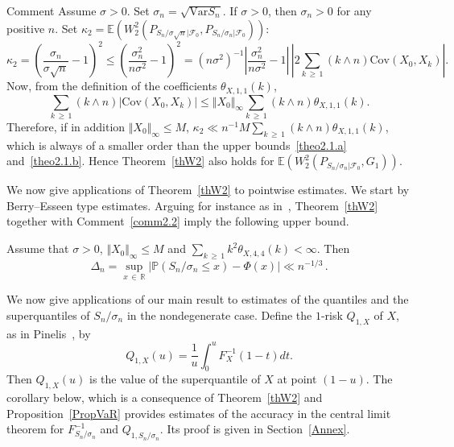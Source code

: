 \documentclass[AHL,Unicode,longabstracts,published]{cedram}
\newcommand{\bbE}{\mathbb{E}}
\newcommand{\clF}{\mathcal{F}}
\newcommand{\bbP}{\mathbb{P}}
\newcommand{\bbR}{\mathbb{R}}
\newcommand{\Cov}{\mathrm{Cov}}
\newcommand{\Var}{\mathrm{Var}}
\begin{document}
\begin{enonce}{Comment} \label{commentaftermainth}
Assume $\sigma >0$. Set $\sigma_n= \sqrt{ \Var S_n }$. If $\sigma>0$, then $\sigma_n>0$ for any positive $n$. Set
$\kappa_2 = \bbE (W_2^2 (P_{S_n / \sigma {\sqrt n} |\clF_0 }, P_{S_n / \sigma_n |\clF_0 }))$:
\[
\kappa_2 =
\left(\frac{\sigma_n}{\sigma \sqrt n} - 1 \right)^2 \leq \left (\frac{\sigma_n^2}{n\sigma^2} - 1 \right)^2 = \left(n\sigma^2\right)^{-1} \left| \frac{\sigma_n^2}{n\sigma^2} - 1 \right| \, \left| 2 \sum_{k\,\geq\,1} (k \wedge n) \Cov (X_0,X_k)\right|.
\]
Now, from the definition of the coefficients $ \theta_{X,1,1} (k)$,
\begin{equation}\label{UpperBoundCov1}
\sum_{k\, \geq\,1} (k \wedge n) | \Cov (X_0,X_k) |
\leq \Vert X_0 \Vert_{\infty} \sum_{k\,\geq\,1} (k \wedge n) \theta_{X,1, 1} (k).
\end{equation}
Therefore, if in addition $\Vert X_0 \Vert_{\infty} \leq M$, $\kappa_2 \ll n^{-1} M \sum_{k\,\geq\,1} (k \wedge n) \theta_{X,1, 1} (k)$, which is always of a smaller order than the upper bounds~\eqref{theo2.1.a} and~\eqref{theo2.1.b}. Hence Theorem~\ref{thW2} also holds for $\bbE (W_2^2 (P_{S_n / \sigma_n |\clF_0 }, G_{1}) ) $.
\end{enonce}

We now give applications of Theorem~\ref{thW2} to pointwise estimates. We start by Berry--Esseen type estimates. Arguing for instance as in~\cite[Remark~2.4]{DMR09}, Theorem~\ref{thW2} together with Comment~\ref{comm2.2} imply the following upper bound.

\begin{coro}\label{AppliBE}
Assume that $\sigma>0$, $\Vert X_0 \Vert_{\infty} \leq M$ and $\sum_{k\, \geq\,1} k^2 \theta_{X,4,4} (k) < \infty$. Then
\[
\Delta_{n} = \sup_{x\,\in\,\bbR}\left| \bbP (S_n/\sigma_n \leq x) - \Phi(x)\right|\ll n^{-1/3} \,.
\]
\end{coro}

We now give applications of our main result to estimates of the quantiles and the superquantiles of $S_n/\sigma_n$ in the nondegenerate case. Define the $1$-risk $Q_{1,X}$ of $X$, as in Pinelis~\cite{Pi14}, by
\begin{equation}\label{DefSuperQuantile}
Q_{1,X} (u) = \frac 1 u \int_0^u F_X^{-1} (1-t) dt.
\end{equation}
Then $Q_{1,X} (u)$ is the value of the superquantile of $X$ at point $(1-u)$. The corollary below, which is a consequence of Theorem~\ref{thW2} and Proposition~\ref{PropVaR} provides estimates of the accuracy in the central limit theorem for $F^{-1}_{S_n/\sigma_n}$ and $Q_{1,S_n/\sigma_n}$. Its proof is given in Section~\ref{Annex}.
\end{document}
